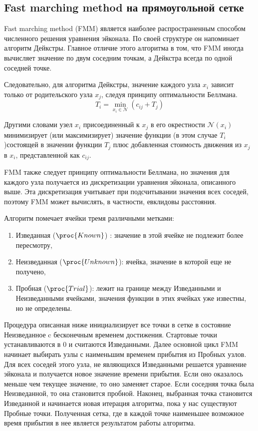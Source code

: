 \subsection{Fast marching method на прямоугольной сетке}
\label{sec:fast-marching-method}

Fast marching method (FMM) \cite{S1999} является наиболее
распространенным способом численного решения уравнения эйконала. По своей
структуре он напоминает алгоритм Дейкстры. Главное отличие этого
алгоритма в том, что FMM иногда вычисляет значение по двум соседним
точкам, а Дейкстра всегда по одной соседней точке. 

Следовательно, для алгоритма Дейкстры, значение каждого узла $x_i$ зависит только от
родительского узла ${x_j}$, следуя принципу оптимальности Беллмана.
\begin{equation*}
  T_i = \min_{x_i\in \mathcal{N}} (c_{ij} + T_j)
\end{equation*}

Другими словами узел $x_i$ присоединенный к $x_j$ в его
окрестности $\mathcal{N}(x_i)$ минимизирует (или
максимизирует) значение функции (в этом случае $T_i$)состоящей в
значении функции $T_j$ плюс добавленная стоимость движения из $x_j$ в
$x_i$, представленной как $c_{ij}$.

FMM также следует принципу оптимальности Беллмана, но значения для
каждого узла получается из дискретизации уравнения эйконала,
описанного выше. Эта дискретизация учитывает при подсчитывании
значения всех соседей, поэтому FMM может вычислять, в частности,
евклидовы расстояния.

Алгоритм помечает ячейки тремя различными метками:
\begin{enumerate}
\item Изведанная ($\proc{Known}$) : значение в этой ячейке не подлежит более
  пересмотру,
\item Неизведанная ($\proc{Unknown}$): ячейка, значение в которой еще не
  получено,
\item Пробная ($\proc{Trial}$): лежит на границе между Изведанными
  и Неизведанными ячейками, значения функции в этих ячейках
  уже известны, но не определены.
\end{enumerate}

Процедура описанная ниже инициализирует все точки в сетке в состояние
Неизведанное c бесконечным временем достижения. Стартовые
точки устанавливаются в $0$ и считаются Изведанными. Далее основной
цикл FMM начинает выбирать узлы с наименьшим временем прибытия из
Пробных узлов. Для всех соседей этого узла, не являющихся
Изведанными решается уравнение эйконала и получается новое
значение времени прибытия. Если оно оказалось меньше чем текущее
значение, то оно заменяет старое. Если соседняя точка была
Неизведанной, то она становится пробной. Наконец, выбранная
точка становится Изведанной и начинается новая итерация
алгоритма, пока у нас существуют Пробные точки. Полученная
сетка, где в каждой точке наименьшее возможное время прибытия в нее
является результатом работы алгоритма.

